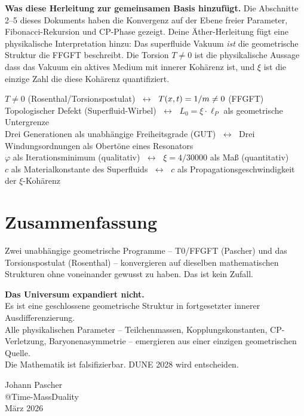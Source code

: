 \begin{response}
\medskip
\textbf{Was diese Herleitung zur gemeinsamen Basis hinzufügt.}
Die Abschnitte 2--5 dieses Dokuments haben die Konvergenz auf der Ebene freier Parameter, Fibonacci-Rekursion und CP-Phase gezeigt. Deine Äther-Herleitung fügt eine physikalische Interpretation hinzu: Das superfluide Vakuum \emph{ist} die geometrische Struktur die FFGFT beschreibt. Die Torsion $T \neq 0$ ist die physikalische Aussage dass das Vakuum ein aktives Medium mit innerer Kohärenz ist, und $\xi$ ist die einzige Zahl die diese Kohärenz quantifiziert.

\begin{foundation}
\centering
$T \neq 0$ (Rosenthal/Torsionspostulat) $\;\longleftrightarrow\;$ $T(x,t) = 1/m \neq 0$ (FFGFT)\\[0.3em]
Topologischer Defekt (Superfluid-Wirbel) $\;\longleftrightarrow\;$ $L_0 = \xi \cdot \ell_P$ als geometrische Untergrenze\\[0.3em]
Drei Generationen als unabhängige Freiheitsgrade (GUT) $\;\longleftrightarrow\;$ Drei Windungsordnungen als Obertöne eines Resonators\\[0.3em]
$\varphi$ als Iterationsminimum (qualitativ) $\;\longleftrightarrow\;$ $\xi = 4/30000$ als Maß (quantitativ)\\[0.3em]
$c$ als Materialkonstante des Superfluids $\;\longleftrightarrow\;$ $c$ als Propagationsgeschwindigkeit der $\xi$-Kohärenz
\end{foundation}
\end{response}

\section{Zusammenfassung}

Zwei unabhängige geometrische Programme -- T0/FFGFT (Pascher) und das Torsionspostulat (Rosenthal) -- konvergieren auf dieselben mathematischen Strukturen ohne voneinander gewusst zu haben. Das ist kein Zufall.

\begin{keyresult}
\centering
\textbf{Das Universum expandiert nicht.}\\[0.3em]
Es ist eine geschlossene geometrische Struktur in fortgesetzter innerer Ausdifferenzierung.\\[0.3em]
Alle physikalischen Parameter -- Teilchenmassen, Kopplungskonstanten, CP-Verletzung, Baryonenasymmetrie -- emergieren aus einer einzigen geometrischen Quelle.\\[0.3em]
Die Mathematik ist falsifizierbar. DUNE 2028 wird entscheiden.
\end{keyresult}

\vspace{2em}
\begin{flushright}
Johann Pascher\\
@Time-MassDuality\\
März 2026
\end{flushright}

